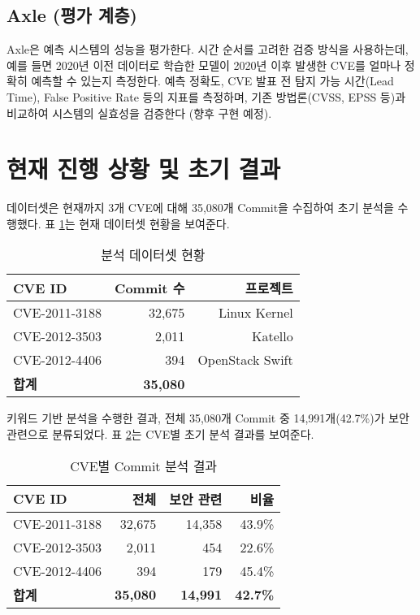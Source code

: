 ﻿\documentclass[conference]{IEEEtran}
\begin{document}
\subsection{Axle (평가 계층)}

Axle은 예측 시스템의 성능을 평가한다. 시간 순서를 고려한 검증 방식을 사용하는데, 예를 들면 2020년 이전 데이터로 학습한 모델이 2020년 이후 발생한 CVE를 얼마나 정확히 예측할 수 있는지 측정한다. 예측 정확도, CVE 발표 전 탐지 가능 시간(Lead Time), False Positive Rate 등의 지표를 측정하며, 기존 방법론(CVSS, EPSS 등)과 비교하여 시스템의 실효성을 검증한다 (향후 구현 예정).


\section{현재 진행 상황 및 초기 결과}

데이터셋은 현재까지 3개 CVE에 대해 35,080개 Commit을 수집하여 초기 분석을 수행했다. 표 \ref{tab:dataset}는 현재 데이터셋 현황을 보여준다.

\begin{table}[h]
\centering
\caption{분석 데이터셋 현황}
\label{tab:dataset}
\begin{tabular}{lrr}
\toprule
\textbf{CVE ID} & \textbf{Commit 수} & \textbf{프로젝트} \\
\midrule
CVE-2011-3188 & 32,675 & Linux Kernel \\
CVE-2012-3503 & 2,011 & Katello \\
CVE-2012-4406 & 394 & OpenStack Swift \\
\midrule
\textbf{합계} & \textbf{35,080} & \\
\bottomrule
\end{tabular}
\end{table}

키워드 기반 분석을 수행한 결과, 전체 35,080개 Commit 중 14,991개(42.7\%)가 보안 관련으로 분류되었다. 표 \ref{tab:commit_analysis}는 CVE별 초기 분석 결과를 보여준다.

\begin{table}[!htbp]
\centering
\caption{CVE별 Commit 분석 결과}
\label{tab:commit_analysis}
\begin{tabular}{lrrr}
\toprule
\textbf{CVE ID} & \textbf{전체} & \textbf{보안 관련} & \textbf{비율} \\
\midrule
CVE-2011-3188 & 32,675 & 14,358 & 43.9\% \\
CVE-2012-3503 & 2,011 & 454 & 22.6\% \\
CVE-2012-4406 & 394 & 179 & 45.4\% \\
\midrule
\textbf{합계} & \textbf{35,080} & \textbf{14,991} & \textbf{42.7\%} \\
\bottomrule
\end{tabular}
\end{table}
\end{document}
